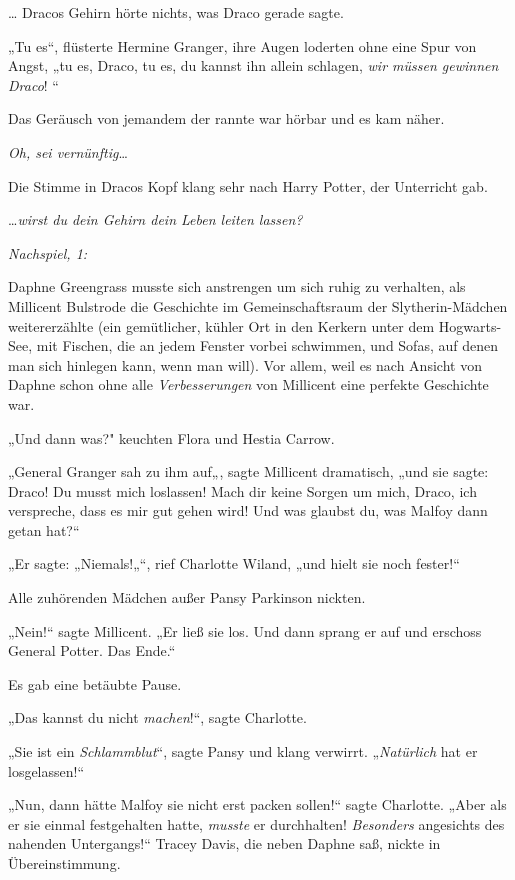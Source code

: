 {… Dracos Gehirn hörte nichts, was Draco gerade sagte.

„Tu es“, flüsterte Hermine Granger, ihre Augen loderten ohne eine Spur von Angst, „tu es, Draco, tu es, du kannst ihn allein schlagen, \emph{wir müssen gewinnen Draco}! “

Das Geräusch von jemandem der rannte war hörbar und es kam näher.

\emph{Oh, sei vernünftig}…

Die Stimme in Dracos Kopf klang sehr nach Harry Potter, der Unterricht gab.

…\emph{wirst du dein Gehirn dein Leben leiten lassen?}

\emph{Nachspiel, 1:}

Daphne Greengrass musste sich anstrengen um sich ruhig zu verhalten, als Millicent Bulstrode die Geschichte im Gemeinschaftsraum der Slytherin-Mädchen weitererzählte (ein gemütlicher, kühler Ort in den Kerkern unter dem Hogwarts-See, mit Fischen, die an jedem Fenster vorbei schwimmen, und Sofas, auf denen man sich hinlegen kann, wenn man will). Vor allem, weil es nach Ansicht von Daphne schon ohne alle \emph{Verbesserungen} von Millicent eine perfekte Geschichte war.

„Und dann was?" keuchten Flora und Hestia Carrow.

„General Granger sah zu ihm auf„, sagte Millicent dramatisch, „und sie sagte: Draco! Du musst mich loslassen! Mach dir keine Sorgen um mich, Draco, ich verspreche, dass es mir gut gehen wird! Und was glaubst du, was Malfoy dann getan hat?“

„Er sagte: „Niemals!„“, rief Charlotte Wiland, „und hielt sie noch fester!“

Alle zuhörenden Mädchen außer Pansy Parkinson nickten.

„Nein!“ sagte Millicent. „Er ließ sie los. Und dann sprang er auf und erschoss General Potter. Das Ende.“

Es gab eine betäubte Pause.

„Das kannst du nicht \emph{machen}!“, sagte Charlotte.

„Sie ist ein \emph{Schlammblut}“, sagte Pansy und klang verwirrt. „\emph{Natürlich} hat er losgelassen!“

„Nun, dann hätte Malfoy sie nicht erst packen sollen!“ sagte Charlotte. „Aber als er sie einmal festgehalten hatte, \emph{musste} er durchhalten! \emph{Besonders} angesichts des nahenden Untergangs!“ Tracey Davis, die neben Daphne saß, nickte in Übereinstimmung.

}
